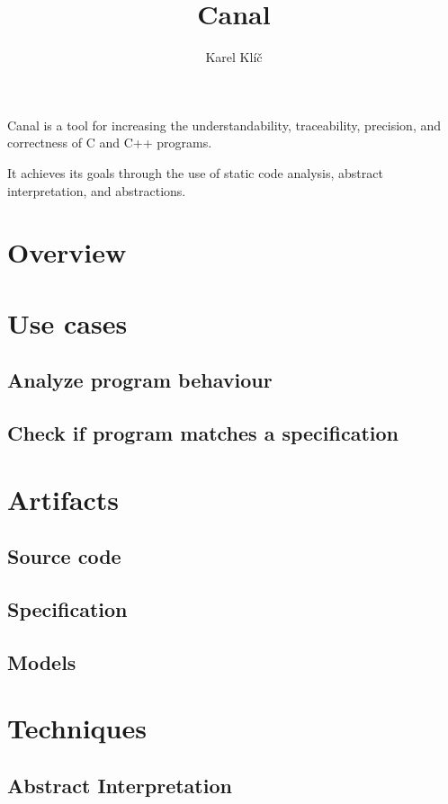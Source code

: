 \documentclass{article}
\title{Canal}
\author{Karel Klíč}
\begin{document}
\maketitle

Canal is a tool for increasing the understandability, traceability,
precision, and correctness of C and C++ programs.

It achieves its goals through the use of static code analysis,
abstract interpretation, and abstractions.

\cleardoublepage
\tableofcontents

\cleardoublepage
\section{Overview}

\section{Use cases}
\subsection{Analyze program behaviour}
\subsection{Check if program matches a specification}

\section{Artifacts}
\subsection{Source code}
\subsection{Specification}
\subsection{Models}

\section{Techniques}
\subsection{Abstract Interpretation}
\end{document}
